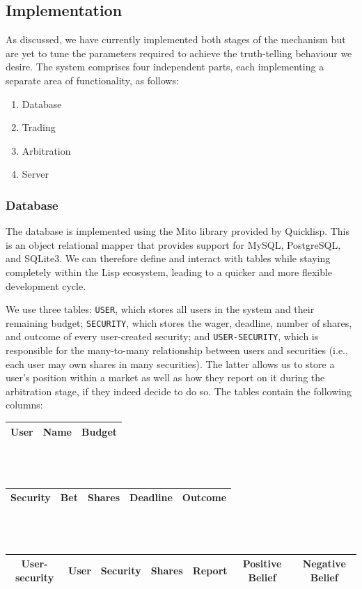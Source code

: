 \documentclass[10pt,a4paper]{article}
\theoremstyle{plain}
\theoremstyle{definition}
\newcommand{\code}[1]{\texttt{#1}}
\begin{document}
\subsection{Implementation}

As discussed, we have currently implemented both stages of the mechanism but
are yet to tune the parameters required to achieve the truth-telling behaviour
we desire. The system comprises four independent parts, each implementing a
separate area of functionality, as follows:

\begin{enumerate}
	\itemsep0em
	\item Database
	\item Trading
	\item Arbitration
	\item Server
\end{enumerate}

\subsubsection{Database}

The database is implemented using the Mito library provided by Quicklisp. This
is an object relational mapper that provides support for MySQL, PostgreSQL, and
SQLite3. We can therefore define and interact with tables while staying
completely within the Lisp ecosystem, leading to a quicker and more flexible
development cycle.

We use three tables: \code{USER}, which stores all users in the system and
their remaining budget; \code{SECURITY}, which stores the wager, deadline,
number of shares, and outcome of every user-created security; and
\code{USER-SECURITY}, which is responsible for the many-to-many relationship
between users and securities (i.e., each user may own shares in many
securities). The latter allows us to store a user's position within a market as
well as how they report on it during the arbitration stage, if they indeed
decide to do so. The tables contain the following columns:

\begin{table}[ht]
	\centering
	\begin{tabular}{|c|c|c|}
		\hline
		\textbf{User} & Name & Budget \\ \hline
	\end{tabular} \\~\\

	\begin{tabular}{|c|c|c|c|c|}
		\hline
		\textbf{Security} & Bet & Shares & Deadline & Outcome \\ \hline
	\end{tabular} \\~\\

	\begin{tabular}{|c|c|c|c|c|c|c|}
		\hline
		\textbf{User-security} & User & Security & Shares & Report & Positive Belief & Negative Belief \\ \hline
	\end{tabular} \\~\\
\end{table}
\end{document}
